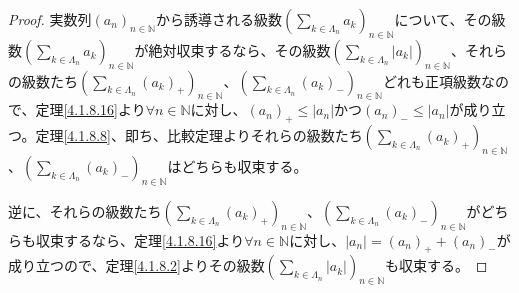 \documentclass[dvipdfmx]{jsarticle}
\begin{document}
\begin{proof}
実数列$\left( a_{n} \right)_{n \in \mathbb{N}}$から誘導される級数$\left( \sum_{k \in \varLambda_{n}} a_{k} \right)_{n \in \mathbb{N}}$について、その級数$\left( \sum_{k \in \varLambda_{n}} a_{k} \right)_{n \in \mathbb{N}}$が絶対収束するなら、その級数$\left( \sum_{k \in \varLambda_{n}} \left| a_{k} \right| \right)_{n \in \mathbb{N}}$、それらの級数たち$\left( \sum_{k \in \varLambda_{n}} \left( a_{k} \right)_{+} \right)_{n \in \mathbb{N}}$、$\left( \sum_{k \in \varLambda_{n}} \left( a_{k} \right)_{-} \right)_{n \in \mathbb{N}}$どれも正項級数なので、定理\ref{4.1.8.16}より$\forall n \in \mathbb{N}$に対し、$\left( a_{n} \right)_{+} \leq \left| a_{n} \right|$かつ$\left( a_{n} \right)_{-} \leq \left| a_{n} \right|$が成り立つ。定理\ref{4.1.8.8}、即ち、比較定理よりそれらの級数たち$\left( \sum_{k \in \varLambda_{n}} \left( a_{k} \right)_{+} \right)_{n \in \mathbb{N}}$、$\left( \sum_{k \in \varLambda_{n}} \left( a_{k} \right)_{-} \right)_{n \in \mathbb{N}}$はどちらも収束する。\par
逆に、それらの級数たち$\left( \sum_{k \in \varLambda_{n}} \left( a_{k} \right)_{+} \right)_{n \in \mathbb{N}}$、$\left( \sum_{k \in \varLambda_{n}} \left( a_{k} \right)_{-} \right)_{n \in \mathbb{N}}$がどちらも収束するなら、定理\ref{4.1.8.16}より$\forall n \in \mathbb{N}$に対し、$\left| a_{n} \right| = \left( a_{n} \right)_{+} + \left( a_{n} \right)_{-}$が成り立つので、定理\ref{4.1.8.2}よりその級数$\left( \sum_{k \in \varLambda_{n}} \left| a_{k} \right| \right)_{n \in \mathbb{N}}$も収束する。
\end{proof}
\end{document}
